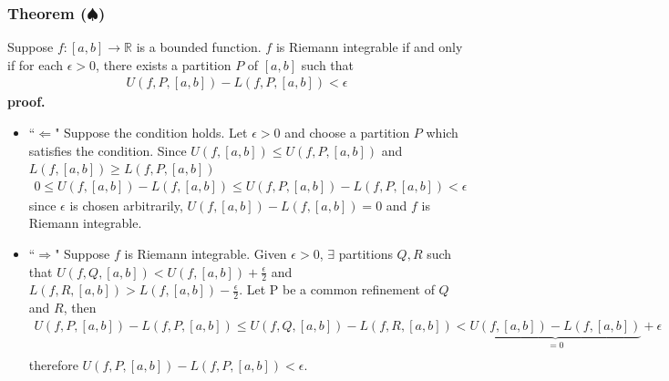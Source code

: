\documentclass[12pt, letterpaper]{article}
\newcommand{\R}{\mathbb{R}}
\renewcommand{\L}{L}
\newcommand{\U}{U}
\begin{document}
\subsubsection*{Theorem ($\spadesuit$) }
{{\color{violet}Suppose $f: [a,b]\rightarrow \R$ is a bounded function. $f$ is Riemann integrable if and only if for each $\epsilon>0$, there exists a partition $P$ of $[a,b]$ such that 
\begin{align*}
    \U(f, P, [a,b])-\L(f, P, [a,b])<\epsilon
\end{align*}
}\textbf{proof.}
\begin{itemize}[label={}]
    \item``$\Leftarrow$"
        Suppose the condition holds. Let $\epsilon>0$ and choose a partition $P$ which satisfies the condition. Since $U(f,[a,b])\leq U(f,P,[a,b])$ and $L(f,[a,b])\geq L(f,P,[a,b])$
        \begin{align*}
            0\leq U(f,[a,b])-L(f,[a,b])\leq U(f,P,[a,b])-L(f,P,[a,b])<\epsilon
        \end{align*}
        since $\epsilon$ is chosen arbitrarily, $U(f,[a,b])-L(f,[a,b])=0$ and $f$ is Riemann integrable.
    \item``$\Rightarrow$"
        Suppose $f$ is Riemann integrable. Given $\epsilon>0$, $\exists$ partitions $Q,R$ such that $U(f,Q,[a,b])<U(f,[a,b]) +\frac{\epsilon}{2}$ and $L(f,R,[a,b])>L(f,[a,b])-\frac{\epsilon}{2}$. Let P be a common refinement of $Q$ and $R$, then
        \begin{align*}
            U(f,P,[a,b])-L(f,P,[a,b])\leq U(f,Q,[a,b])-L(f,R,[a,b])<\underbrace{U(f,[a,b])-L(f,[a,b])}_{=0}+\epsilon\\
        \end{align*}
        therefore $U(f,P,[a,b])-L(f,P,[a,b])<\epsilon$.
\end{itemize}

\clearpage

}
\end{document}

